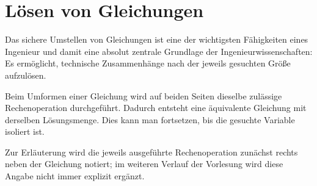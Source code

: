 \section{Lösen von Gleichungen}
\label{sec:fundamentals_solving_equations}

Das sichere Umstellen von Gleichungen ist eine der wichtigsten Fähigkeiten
eines Ingenieur und damit eine absolut zentrale Grundlage der
Ingenieurwissenschaften: Es ermöglicht, technische Zusammenhänge nach der
jeweils gesuchten Größe aufzulösen.

Beim Umformen einer Gleichung wird auf beiden Seiten dieselbe zulässige
Rechenoperation durchgeführt. Dadurch entsteht eine äquivalente Gleichung mit
derselben Lösungsmenge. Dies kann man fortsetzen, bis die gesuchte Variable isoliert ist.

Zur Erläuterung wird die jeweils ausgeführte Rechenoperation zunächst rechts
neben der Gleichung notiert; im weiteren Verlauf der Vorlesung wird diese
Angabe nicht immer explizit ergänzt.



